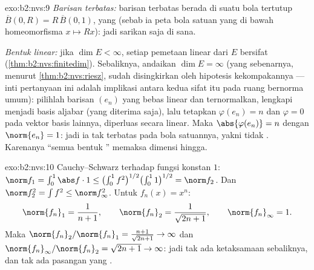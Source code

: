 \begin{solution}{exo:b2:nvs:9}
\emph{Barisan terbatas:} barisan terbatas berada di suatu bola
tertutup $\overline B(0, R) = R\,\overline B(0,1)$, yang  (sebab ia
peta bola satuan yang  di bawah homeomorfisma $x \mapsto Rx$):
jadi sarikan saja di sana.

\emph{Bentuk linear:} jika $\dim E < \infty$, setiap pemetaan linear dari
$E$ bersifat  (\cref{thm:b2:nvs:finitedim}). Sebaliknya,
andaikan $\dim E = \infty$ (yang sebenarnya, menurut
\cref{thm:b2:nvs:riesz}, sudah disingkirkan oleh hipotesis
kekompakannya --- inti pertanyaan ini adalah implikasi antara kedua
sifat itu pada ruang bernorma umum): pilihlah barisan $(e_n)$ yang bebas
linear dan ternormalkan, lengkapi menjadi basis aljabar (yang diterima
saja), lalu tetapkan $\varphi(e_n) = n$ dan $\varphi = 0$ pada vektor
basis lainnya, diperluas secara linear. Maka $\abs{\varphi(e_n)} = n$
dengan $\norm{e_n} = 1$: jadi ia tak terbatas pada bola satuannya, yakni
tidak . Karenanya ``semua bentuk '' memaksa dimensi hingga.
\end{solution}

\begin{solution}{exo:b2:nvs:10}
Cauchy--Schwarz terhadap fungsi konstan $1$: $\norm f_1 =
\int_0^1 \abs f\cdot 1 \leq \bigl(\int_0^1
f^2\bigr)^{1/2}\bigl(\int_0^1 1\bigr)^{1/2} = \norm f_2$. Dan
$\norm f_2^2 = \int f^2 \leq \norm f_\infty^2$. Untuk $f_n(x) = x^n$:
\[
\norm{f_n}_1 = \frac1{n+1}, \qquad
\norm{f_n}_2 = \frac1{\sqrt{2n+1}}, \qquad
\norm{f_n}_\infty = 1 .
\]
Maka $\norm{f_n}_2/\norm{f_n}_1 = \frac{n+1}{\sqrt{2n+1}} \to
\infty$ dan $\norm{f_n}_\infty/\norm{f_n}_2 = \sqrt{2n+1} \to
\infty$: jadi tak ada ketaksamaan sebaliknya, dan tak ada pasangan yang .
\end{solution}


